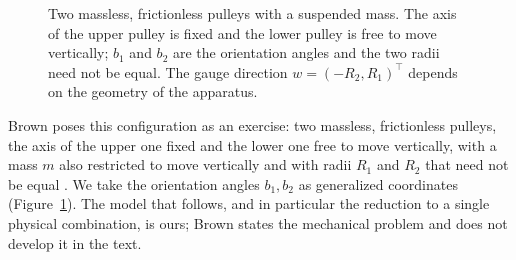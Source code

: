 \documentclass[12pt]{article}
\theoremstyle{plain}
\theoremstyle{definition}
\theoremstyle{remark}
\begin{document}
\begin{figure}[htbp]
		\caption{Two massless, frictionless pulleys with a suspended mass. The axis
			of the upper pulley is fixed and the lower pulley is free to move
			vertically; $b_{1}$ and $b_{2}$ are the orientation angles and the two radii
			need not be equal. The gauge direction $w=(-R_{2},R_{1})^{\top}$ depends on
			the geometry of the apparatus.}
		\label{fig:pulley2}
	\end{figure}
	
	Brown poses this configuration as an exercise: two massless, frictionless
	pulleys, the axis of the upper one fixed and the lower one free to move
	vertically, with a mass $m$ also restricted to move vertically and with radii
	$R_{1}$ and $R_{2}$ that need not be equal \cite{Brown2023}. We take the
	orientation angles $b_{1},b_{2}$ as generalized coordinates
	(Figure~\ref{fig:pulley2}). The model that follows, and in particular the
	reduction to a single physical combination, is ours; Brown states the mechanical
	problem and does not develop it in the text.
	
\end{document}
